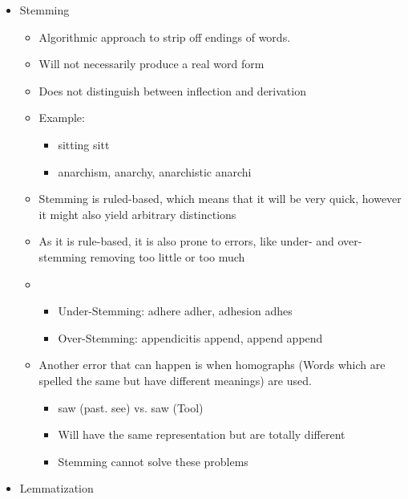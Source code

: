 \documentclass[
../../NLP4W_Summary.tex,
]
{subfiles}
\begin{document}
\begin{defbox}
    \begin{itemize}
        \item Stemming
        \begin{itemize}
            \item Algorithmic approach to strip off endings of words.
            \item Will not necessarily produce a real word form
            \item Does not distinguish between inflection and derivation
            \item Example: 
            \begin{itemize}
                \item sitting \rightarrow sitt
                \item anarchism, anarchy, anarchistic \rightarrow anarchi
            \end{itemize}
            \item Stemming is ruled-based, which means that it will be very quick, however it might also yield arbitrary distinctions
            \item As it is rule-based, it is also prone to errors, like under- and over-stemming \rightarrow removing too little or too much
            \item \begin{itemize}
                \item Under-Stemming: adhere \rightarrow adher, adhesion \rightarrow adhes
                \item Over-Stemming: appendicitis \rightarrow append, append \rightarrow append
            \end{itemize}
            \item Another error that can happen is when homographs (Words which are spelled the same but have different meanings) are used.
            \begin{itemize}
                \item saw (past. see) vs. saw (Tool)
                \item Will have the same representation but are totally different
                \item Stemming cannot solve these problems
            \end{itemize}
        \end{itemize}
        \item Lemmatization
        \begin{itemize}

\end{itemize}
\end{itemize}
\end{defbox}
\end{document}
